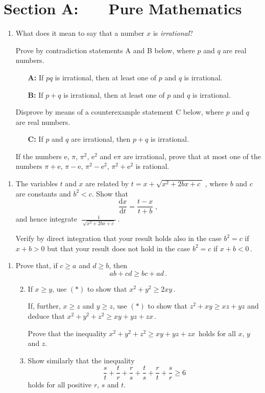 \documentclass[a4, 11pt]{report}
\newlength{\qspace}
\newcounter{qnumber}
\newenvironment{question}%
 {\vspace{\qspace}
  \begin{enumerate}[\bfseries 1\quad][10]%
    \setcounter{enumi}{\value{qnumber}}%
    \item%
 }
{
  \end{enumerate}
  \filbreak
  \stepcounter{qnumber}
 }
\newenvironment{questionparts}[1][1]%
 {
  \begin{enumerate}[\bfseries (i)]%
    \setcounter{enumii}{#1}
    \addtocounter{enumii}{-1}
    \setlength{\itemsep}{5mm}
    \setlength{\parskip}{8pt}
 }
 {
  \end{enumerate}
 }
\def\d{{\mathrm d}}
\def\e{{\mathrm e}}
\def\ge{\geqslant}
\newcommand{\ds}{\displaystyle}
\begin{document}
\setcounter{page}{2}

 
\section*{Section A: \ \ \ Pure Mathematics}

\begin{question}
What does it mean to say that a number $x$ is {\em irrational}?


Prove by contradiction statements A and B below, where $p$ and $q$ are
real numbers.
\begin{itemize}
\item [\quad\bf A:] If $pq$ is irrational, then at least one
of $p$ and $q$ is irrational.
\item [\quad\bf B:] If $p+q$ is irrational, then at least one of 
$p$ and $q$ is irrational.
\end{itemize}
Disprove  by means of a counterexample  statement C below, 
where $p$ and $q$ are
real numbers.
\begin{itemize}
\item [\quad\bf C:]
If $p$ and $q$ are irrational, then $p+q$ is  irrational.
\end{itemize}


If the numbers $\e$, $\pi$, $\pi^2$, $\e^2$ and 
$\e\pi$ are irrational, prove  that at most one of the numbers
$\pi+\e$, $\pi -\e$, $\pi^2-\e^2$, $\pi^2+\e^2$ is rational.
\end{question}

\begin{question}
The variables $t$ and $x$ are related by
 $t=x+ \sqrt{x^2+2bx+c\;} \,$, where $b$ and $c$ are constants
and $b^2<c$.  Show that 
\[
\frac{\d x}{\d t} = \frac{t-x}{t+b}\;,
\]
and hence
 integrate
$ \ \ds \frac1 {\ \sqrt{x^2+2bx+c} \ }\,$.

Verify by direct integration that your result holds also 
in the case $b^2=c$ if  $x+b>0$ but that your result 
does not hold in the case
$b^2=c$ if $x+b<0\,$.
\end{question}

\begin{question}
Prove that, if $c\ge a$ and $d\ge b$, then 
\[
ab+cd\ge bc+ad\,.
\tag{$*$}
\]

\begin{questionparts} 
\item If $x\ge y$, use $(*)$ to show that $x^2+y^2\ge 2xy\,$.

If, further, $x\ge z$ and $y\ge z$, use $(*)$ to
 show that $z^2+xy\ge xz+yz$ and deduce 
that $x^2+y^2+z^2\ge xy+yz+zx\,$. 

Prove that 
the inequality  $x^2+y^2+z^2\ge xy+yz+zx\,$
holds for all $x$, $y$ and $z$.



\item Show similarly that the inequality
\[\frac st +\frac tr +\frac rs 
+\frac ts +\frac rt +\frac sr 
\ge 6\]
 holds for all
positive $r$, $s$ and $t$.


\end{questionparts}
\end{question}
\end{document}
